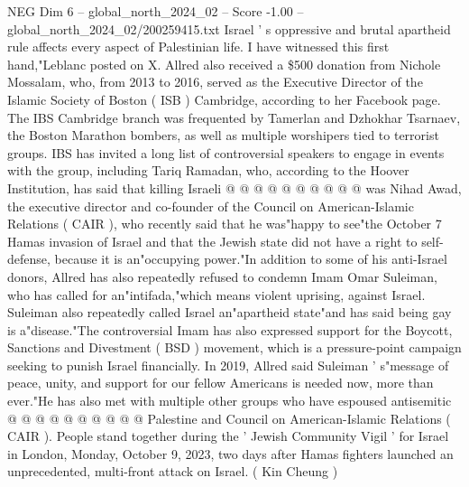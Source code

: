 \begin{textsample}{NEG Dim 6 – global\_north\_2024\_02 – Score -1.00 – global\_north\_2024\_02/200259415.txt}
Israel ' s oppressive and brutal apartheid rule affects every aspect of Palestinian life.
I have witnessed this first hand,"Leblanc posted on X.
Allred also received a \$500 donation from Nichole Mossalam, who, from 2013 to 2016, served as the Executive Director of the Islamic Society of Boston ( ISB ) Cambridge, according to her Facebook page.
The IBS Cambridge branch was frequented by Tamerlan and Dzhokhar Tsarnaev, the Boston Marathon bombers, as well as multiple worshipers tied to terrorist groups.
IBS has invited a long list of controversial speakers to engage in events with the group, including Tariq Ramadan, who, according to the Hoover Institution, has said that killing Israeli @ @ @ @ @ @ @ @ @ @ was Nihad Awad, the executive director and co-founder of the Council on American-Islamic Relations ( CAIR ), who recently said that he was"happy to see"the October 7 Hamas invasion of Israel and that the Jewish state did not have a right to self-defense, because it is an"occupying power."In addition to some of his anti-Israel donors, Allred has also repeatedly refused to condemn Imam Omar Suleiman, who has called for an"intifada,"which means violent uprising, against Israel.
Suleiman also repeatedly called Israel an"apartheid state"and has said being gay is a"disease."The controversial Imam has also expressed support for the Boycott, Sanctions and Divestment ( BSD ) movement, which is a pressure-point campaign seeking to punish Israel financially.
In 2019, Allred said Suleiman ' s"message of peace, unity, and support for our fellow Americans is needed now, more than ever."He has also met with multiple other groups who have espoused antisemitic @ @ @ @ @ @ @ @ @ @ Palestine and Council on American-Islamic Relations ( CAIR ).
People stand together during the ' Jewish Community Vigil ' for Israel in London, Monday, October 9, 2023, two days after Hamas fighters launched an unprecedented, multi-front attack on Israel. ( Kin Cheung )

\end{textsample}
